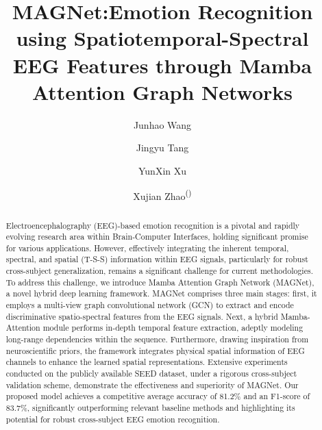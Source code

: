 \documentclass[runningheads]{llncs}
\begin{document}
%
\title{MAGNet:Emotion Recognition using Spatiotemporal-Spectral EEG Features through Mamba Attention Graph Networks
}
%
%
\author{Junhao Wang \and
Jingyu Tang \and
YunXin Xu \and
Xujian Zhao\textsuperscript{(\Letter)}}
%
%
%
\maketitle              %
%



\begin{abstract}
Electroencephalography (EEG)-based emotion recognition is a pivotal and rapidly evolving research area within Brain-Computer Interfaces, holding significant promise for various applications. However, effectively integrating the inherent temporal, spectral, and spatial (T-S-S) information within EEG signals, particularly for robust cross-subject generalization, remains a significant challenge for current methodologies. To address this challenge, we introduce Mamba Attention Graph Network (MAGNet), a novel hybrid deep learning framework. MAGNet comprises three main stages: first, it employs a multi-view graph convolutional network (GCN) to extract and encode discriminative spatio-spectral features from the EEG signals. Next, a hybrid Mamba-Attention module performs in-depth temporal feature extraction, adeptly modeling long-range dependencies within the sequence. Furthermore, drawing inspiration from neuroscientific priors, the framework integrates physical spatial information of EEG channels to enhance the learned spatial representations. Extensive experiments conducted on the publicly available SEED dataset, under a rigorous cross-subject validation scheme, demonstrate the effectiveness and superiority of MAGNet. Our proposed model achieves a competitive average accuracy of 81.2\% and an F1-score of 83.7\%, significantly outperforming relevant baseline methods and highlighting its potential for robust cross-subject EEG emotion recognition.

\end{abstract}
%
%
%
\end{document}
